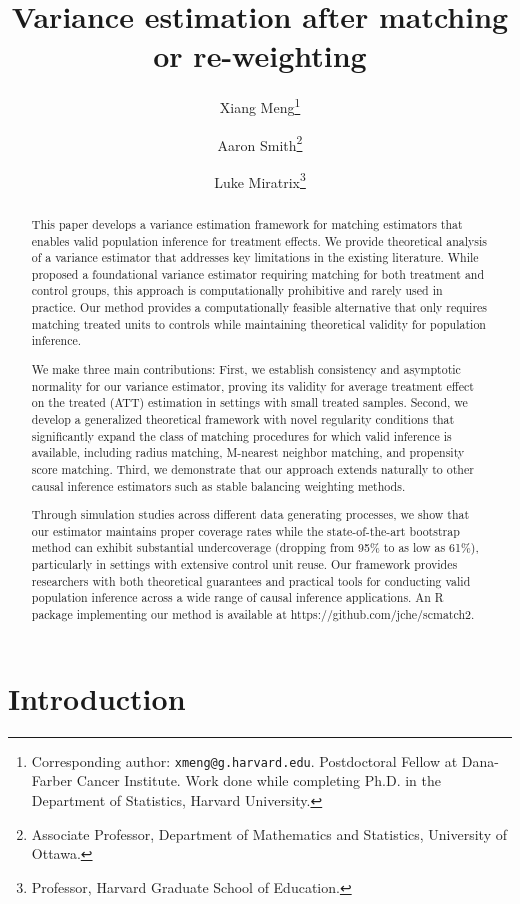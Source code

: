 \documentclass{mytemplate}
\title{Variance estimation after matching or re-weighting}
\author{
Xiang Meng\thanks{Corresponding author: \texttt{xmeng@g.harvard.edu}. Postdoctoral Fellow at Dana-Farber Cancer Institute. Work done while completing Ph.D. in the Department of Statistics, Harvard University.}
\and
Aaron Smith\thanks{Associate Professor, Department of Mathematics and Statistics, University of Ottawa.}
\and
Luke Miratrix\thanks{Professor, Harvard Graduate School of Education.}
}
\begin{document}
\maketitle

\begin{abstract}
This paper develops a variance estimation framework for matching estimators that enables valid population inference for treatment effects. We provide theoretical analysis of a variance estimator that addresses key limitations in the existing literature. While \cite{abadie2006large} proposed a foundational variance estimator requiring matching for both treatment and control groups, this approach is computationally prohibitive and rarely used in practice. Our method provides a computationally feasible alternative that only requires matching treated units to controls while maintaining theoretical validity for population inference. 

We make three main contributions: First, we establish consistency and asymptotic normality for our variance estimator, proving its validity for average treatment effect on the treated (ATT) estimation in settings with small treated samples. Second, we develop a generalized theoretical framework with novel regularity conditions that significantly expand the class of matching procedures for which valid inference is available, including radius matching, M-nearest neighbor matching, and propensity score matching. Third, we demonstrate that our approach extends naturally to other causal inference estimators such as stable balancing weighting methods. 

Through simulation studies across different data generating processes, we show that our estimator maintains proper coverage rates while the state-of-the-art bootstrap method can exhibit substantial undercoverage (dropping from 95\% to as low as 61\%), particularly in settings with extensive control unit reuse. Our framework provides researchers with both theoretical guarantees and practical tools for conducting valid population inference across a wide range of causal inference applications. An R package implementing our method is available at https://github.com/jche/scmatch2.
\end{abstract}


\section{Introduction}
\end{document}
